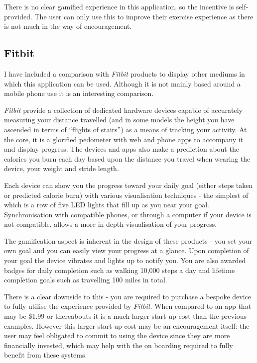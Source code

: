 There is no clear gamified experience in this application, so the
incentive is self-provided. The user can only use this to improve
their exercise experience as there is not much in the way of
encouragement. 

\subsection{Fitbit}
\label{sec:fitbit}
I have included a comparison with \emph{Fitbit} products to display other
mediums in which this application can be used. Although it is not
mainly based around a mobile phone use it is an interesting comparison.

\emph{Fitbit} provide a collection of dedicated hardware devices capable of
accurately measuring your distance travelled (and in some models the
height you have ascended in terms of ``flights of stairs'') as a means
of tracking your activity. At the core, it is a glorified pedometer
with web and phone apps to accompany it and display progress. The
devices and apps also make a prediction about the calories you burn each
day based upon the distance you travel when wearing the device, your
weight and stride length. 

Each device can show you the progress toward your daily goal (either
steps taken or predicted calorie burn) with various visualisation
techniques - the simplest of which is a row of five LED lights that
fill up as you near your goal. Synchronisation with compatible phones,
or through a computer if your device is not compatible, allows a more
in depth visualisation of your progress.

The gamification aspect is inherent in the design of these products -
you set your own goal and you can easily view your progress at a
glance. Upon completion of your goal the device vibrates and lights up
to notify you. You are also awarded badges for daily completion such
as walking 10,000 steps a day and lifetime completion goals such as
travelling 100 miles in total.

There is a clear downside to this - you are required to purchase a
bespoke device to fully utilise the experience provided by
\emph{Fitbit}. When compared to an app that may be \$1.99 or thereabouts it is
a much larger start up cost than the previous examples. However this
larger start up cost may be an encouragement itself: the user may
feel obligated to commit to using the device since they are more
financially invested, which may help with the on boarding required to
fully benefit from these systems.

